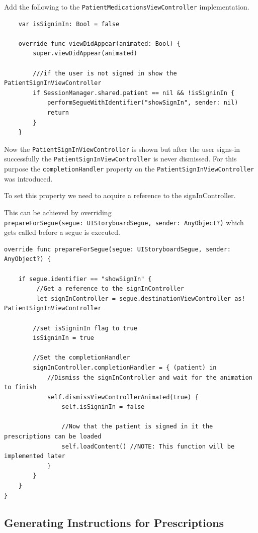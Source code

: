 \documentclass{article}
\begin{document}
Add the following to the \texttt{PatientMedicationsViewController}
implementation.

\begin{verbatim}
    var isSigninIn: Bool = false

    override func viewDidAppear(animated: Bool) {
        super.viewDidAppear(animated)

        ///if the user is not signed in show the PatientSignInViewController
        if SessionManager.shared.patient == nil && !isSigninIn {
            performSegueWithIdentifier("showSignIn", sender: nil)
            return
        }
    }
\end{verbatim}
Now the \texttt{PatientSignInViewController} is shown but after the user
signs-in successfully the \texttt{PatientSignInViewController} is never
dismissed. For this purpose the \texttt{completionHandler} property on
the \texttt{PatientSignInViewController} was introduced.

To set this property we need to acquire a reference to the
signInController.

This can be achieved by overriding
\texttt{prepareForSegue(segue:\ UIStoryboardSegue,\ sender:\ AnyObject?)}
which gets called before a segue is executed.

\begin{verbatim}
override func prepareForSegue(segue: UIStoryboardSegue, sender: AnyObject?) {

    if segue.identifier == "showSignIn" {
         //Get a reference to the signInController
         let signInController = segue.destinationViewController as! PatientSignInViewController

        //set isSigninIn flag to true
        isSigninIn = true

        //Set the completionHandler
        signInController.completionHandler = { (patient) in
            //Dismiss the signInController and wait for the animation to finish
            self.dismissViewControllerAnimated(true) {
                self.isSigninIn = false

                //Now that the patient is signed in it the prescriptions can be loaded
                self.loadContent() //NOTE: This function will be implemented later
            }
        }
    }
}
\end{verbatim}

\subsection{Generating Instructions for Prescriptions}\label{step-6.3---implementing-patientmedicationsviewcontroller---generating-instructions-for-prescriptions}
\end{document}
